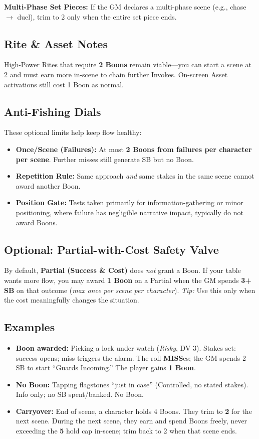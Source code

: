 \textbf{Multi-Phase Set Pieces:} If the GM declares a multi-phase scene (e.g., chase $\rightarrow$ duel), trim to 2 only when the entire set piece ends.

\subsection*{Rite \& Asset Notes}
High-Power Rites that require \textbf{2 Boons} remain viable—you can start a scene at 2 and must earn more in-scene to chain further Invokes. On-screen Asset activations still cost 1 Boon as normal.

\subsection*{Anti-Fishing Dials}
These optional limits help keep flow healthy:
\begin{itemize}
  \item \textbf{Once/Scene (Failures):} At most \textbf{2 Boons from failures per character per scene}. Further misses still generate SB but no Boon.
  \item \textbf{Repetition Rule:} Same approach \emph{and} same stakes in the same scene cannot award another Boon.
  \item \textbf{Position Gate:} Tests taken primarily for information-gathering or minor positioning, where failure has negligible narrative impact, typically do not award Boons.
\end{itemize}

\subsection*{Optional: Partial-with-Cost Safety Valve}
By default, \textbf{Partial (Success \& Cost)} does \emph{not} grant a Boon. If your table wants more flow, you may award \textbf{1 Boon} on a Partial when the GM spends \textbf{3+ SB} on that outcome (\emph{max once per scene per character}). \emph{Tip:} Use this only when the cost meaningfully changes the situation.

\subsection*{Examples}
\begin{itemize}
  \item \textbf{Boon awarded:} Picking a lock under watch (\emph{Risky}, DV 3). Stakes set: success opens; miss triggers the alarm. The roll \textbf{MISS}es; the GM spends 2 SB to start ``Guards Incoming.'' The player gains \textbf{1 Boon}.
  \item \textbf{No Boon:} Tapping flagstones ``just in case'' (Controlled, no stated stakes). Info only; no SB spent/banked. No Boon.
  \item \textbf{Carryover:} End of scene, a character holds 4 Boons. They trim to \textbf{2} for the next scene. During the next scene, they earn and spend Boons freely, never exceeding the \textbf{5} hold cap in-scene; trim back to 2 when that scene ends.
\end{itemize}

